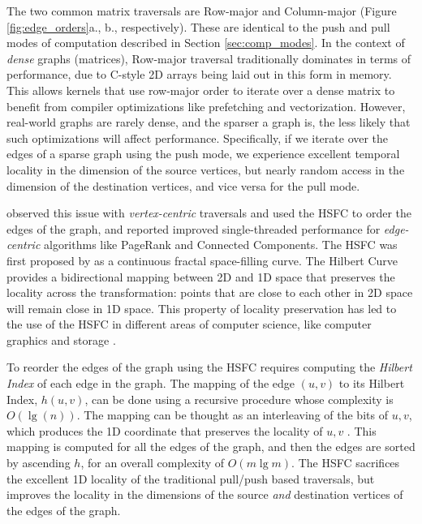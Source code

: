 The two common matrix traversals are Row-major and Column-major (Figure \ref{fig:edge_orders}a., b., respectively).
These are identical to the push and pull modes of computation described in Section \ref{sec:comp_modes}. In the context of \textit{dense} graphs (matrices), Row-major traversal traditionally dominates in terms of performance, due to C-style 2D arrays being laid out in this form in memory. This allows kernels that use row-major order to iterate over a dense matrix to benefit from compiler optimizations like prefetching and vectorization. 
However, real-world graphs are rarely dense, and the sparser a graph is, the less likely that such optimizations will affect performance.
Specifically, if we iterate over the edges of a sparse graph using the push mode, we experience excellent temporal locality in the dimension of the source vertices, but nearly random access in the dimension of the destination vertices, and vice versa for the pull mode. 

\citet{cost} observed this issue with \textit{vertex-centric} traversals and used the \ac{HSFC} to order the edges of the graph, and reported improved single-threaded performance for \textit{edge-centric} algorithms like PageRank and Connected Components. The \ac{HSFC} was first proposed by \citet{hilbert1935stetige} as a continuous fractal space-filling curve. The Hilbert Curve provides a bidirectional mapping between 2D and 1D space that preserves the locality across the transformation: points that are close to each other in 2D space will remain close in 1D space. 
This property of locality preservation has led to the use of the \ac{HSFC} in different areas of computer science, like computer graphics \cite{dafner2000context} and storage \cite{lawder2001querying}.

To reorder the edges of the graph using the \ac{HSFC} requires computing the \textit{Hilbert Index} of each edge in the graph. The mapping of the edge $(u,v)$ to its Hilbert Index, $h(u,v)$, can be done using a recursive procedure \cite{hilbert_recursion} whose complexity is $O(\lg(n))$. The mapping can be thought as an interleaving of the bits of $u, v$, which produces the 1D coordinate that preserves the locality of $u, v$ \cite{cost}. This mapping is computed for all the edges of the graph, and then the edges are sorted by ascending $h$, for an overall complexity of $O(m\lg m)$. The \ac{HSFC} sacrifices the excellent 1D locality of the traditional pull/push based traversals, but improves the locality in the dimensions of the source \textit{and} destination vertices of the edges of the graph.

